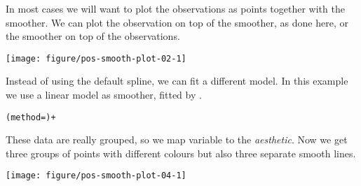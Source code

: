 \documentclass[krantz2]{krantz}\usepackage{knitr}%
\begin{document}
In most cases we will want to plot the observations as points together with the smoother. We can plot the observation on top of the smoother, as done here, or the smoother on top of the observations.

\begin{knitrout}\footnotesize
{}\color{fgcolor}\begin{kframe}
\begin{alltt}
\hlstd{(}  \hlstd{(}    \hlopt{+}
  \hlstd{()} \hlopt{+}
  \hlstd{()}
\end{alltt}


{\ttfamily\noindent\itshape{}}\end{kframe}

{\centering \texttt{[image: figure/pos-smooth-plot-02-1]} 

}



\end{knitrout}

Instead of using the default spline, we can fit a different model. In this example we use a linear model as smoother, fitted by .

\begin{knitrout}\footnotesize
{}\color{fgcolor}\begin{kframe}
\begin{alltt}
  (method=) +
\end{alltt}
\end{kframe}
\end{knitrout}

These data are really grouped, so we map variable  to the  \emph{aesthetic}. Now we get three groups of points with different colours but also three separate smooth lines.

\begin{knitrout}\footnotesize
{}\color{fgcolor}\begin{kframe}
\begin{alltt}
\hlstd{(}  \hlstd{(}     \hlstd{=}  \hlopt{+}
  \hlstd{(} \hlstd{=} \hlstd{)} \hlopt{+}
  \hlstd{()}
\end{alltt}
\end{kframe}

{\centering \texttt{[image: figure/pos-smooth-plot-04-1]} 

}



\end{knitrout}
\end{document}
